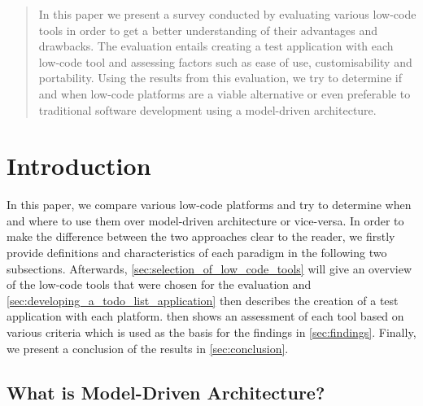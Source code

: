 \documentclass[runningheads]{llncs}
\begin{document}

\maketitle

\vspace{8em}

\begin{abstract}

In this paper we present a survey conducted by evaluating various low-code tools in order to get a better understanding of their advantages and drawbacks. The evaluation entails creating a test application with each low-code tool and assessing factors such as ease of use, customisability and portability. Using the results from this evaluation, we try to determine if and when low-code platforms are a viable alternative or even preferable to traditional software development using a model-driven architecture.


\end{abstract}

\newpage

\section{Introduction}
\label{sec:introduction}

In this paper, we compare various low-code platforms and try to determine when and where to use them over model-driven architecture or vice-versa. In order to make the difference between the two approaches clear to the reader, we firstly provide definitions and characteristics of each paradigm in the following two subsections. Afterwards, \cref{sec:selection_of_low_code_tools} will give an overview of the low-code tools that were chosen for the evaluation and \cref{sec:developing_a_todo_list_application} then describes the creation of a test application with each platform.  then shows an assessment of each tool based on various criteria which is used as the basis for the findings in \cref{sec:findings}. Finally, we present a conclusion of the results in \cref{sec:conclusion}.

\subsection{What is Model-Driven Architecture?}
\label{ssec:what_is_model_driven}
\end{document}
